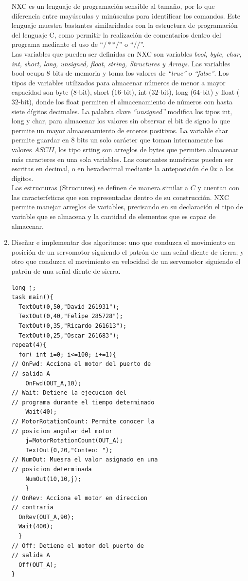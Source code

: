 \documentclass[twocolumn]{IEEEtran}
\begin{document}
\begin{enumerate}
NXC es un lenguaje de programación sensible al tamaño, por lo que diferencia entre mayúsculas y minúsculas para identificar los comandos. Este lenguaje muestra bastantes similaridades con la estructura de programación del lenguaje C, como permitir la realización de comentarios dentro del programa mediante el uso de ``$/**/$'' o ``$//$''.\\
Las variables que pueden ser definidas en NXC son variables \textit{bool, byte, char, int, short, long, unsigned, float, string, Structures y Arrays}. Las variables bool ocupa $8$ bits de memoria y toma los valores  de \textit{``true''} o \textit{``false''}. Los tipos de variables utilizados para almacenar números  de menor a mayor capacidad son byte ($8$-bit), short ($16$-bit), int ($32$-bit), long ($64$-bit) y float ($32$-bit), donde los float permiten el almacenamiento de números con hasta siete dígitos decimales. La palabra clave \textit{``unsigned''} modifica los tipos int, long y char, para almacenar los valores sin observar el bit de signo lo que permite un mayor almacenamiento de enteros positivos. La variable char permite guardar en 8 bits un solo carácter que toman internamente los valores $ASCII$, los tipo srting son arreglos de bytes que permiten almacenar más caracteres en una sola variables. Las constantes numéricas pueden ser escritas en decimal, o en hexadecimal mediante la anteposición de $0x$ a los dígitos.      \\
Las estructuras (Structures) se definen de manera similar a $C$ y cuentan con las características que  son representadas dentro de su construcción. NXC permite manejar arreglos de variables, precisando en su declaración el tipo de variable que se almacena y la cantidad de elementos que es capaz de almacenar.\\

 \item Diseñar e implementar dos algoritmos: uno que conduzca el movimiento en posición de un servomotor siguiendo el patrón de una señal diente de sierra; y otro que conduzca el movimiento en velocidad de un servomotor siguiendo el patrón de una señal diente de sierra.
\lstset{numbers=left, numberstyle=\tiny, stepnumber=1, numbersep=1pt}
\begin{lstlisting}[firstnumber=1, caption=Código Posición, label=code1]
  long j;
task main(){
  TextOut(0,50,"David 261931");
  TextOut(0,40,"Felipe 285728");
  TextOut(0,35,"Ricardo 261613");
  TextOut(0,25,"Oscar 261683");
repeat(4){
  for( int i=0; i<=100; i+=1){
// OnFwd: Acciona el motor del puerto de
// salida A
    OnFwd(OUT_A,10);
// Wait: Detiene la ejecucion del
// programa durante el tiempo determinado
    Wait(40);
// MotorRotationCount: Permite conocer la
// posicion angular del motor
    j=MotorRotationCount(OUT_A);
    TextOut(0,20,"Conteo: ");
// NumOut: Muesra el valor asignado en una
// posicion determinada
    NumOut(10,10,j);
    }
// OnRev: Acciona el motor en direccion
// contraria
  OnRev(OUT_A,90);
  Wait(400);
  }
// Off: Detiene el motor del puerto de
// salida A
  Off(OUT_A);
}
\end{lstlisting}


\end{enumerate}
\end{document}

